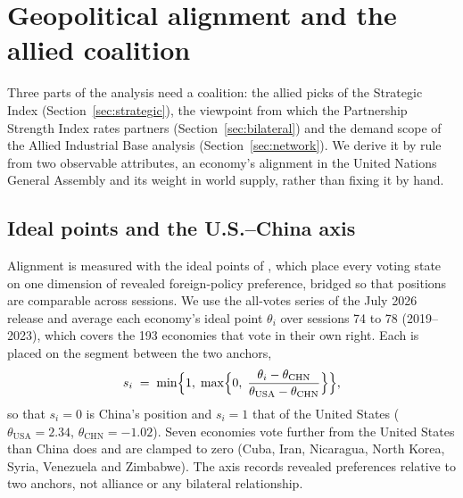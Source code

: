 \section{Geopolitical alignment and the allied coalition}\label{sec:coalition}

Three parts of the analysis need a coalition: the allied picks of the Strategic Index
(Section~\ref{sec:strategic}), the viewpoint from which the Partnership Strength Index rates partners
(Section~\ref{sec:bilateral}) and the demand scope of the Allied Industrial Base analysis
(Section~\ref{sec:network}). We
derive it by rule from two observable attributes, an economy's alignment in the United Nations
General Assembly and its weight in world supply, rather than fixing it by hand.

\subsection{Ideal points and the U.S.--China axis}\label{subsec:coalition_axis}

Alignment is measured with the ideal points of \citet{bailey2017estimating}, which place every
voting state on one dimension of revealed foreign-policy preference, bridged so that positions are
comparable across sessions. We use the all-votes series of the July 2026 release
\citep[Dataverse V39;][]{voeten2009unga} and average each economy's ideal point $\theta_i$ over
sessions 74 to 78 (2019--2023), which covers the 193 economies that vote in their own right. Each is
placed on the segment between the two anchors,
\begin{equation}\label{eq:coalition_axis}
  s_i \;=\; \min\Bigl\{1,\;\max\Bigl\{0,\;
  \frac{\theta_i-\theta_{\mathrm{CHN}}}{\theta_{\mathrm{USA}}-\theta_{\mathrm{CHN}}}\Bigr\}\Bigr\},
\end{equation}
so that $s_i=0$ is China's position and $s_i=1$ that of the United States
($\theta_{\mathrm{USA}}=2.34$, $\theta_{\mathrm{CHN}}=-1.02$). Seven economies vote further from the
United States than China does and are clamped to zero (Cuba, Iran, Nicaragua, North Korea, Syria,
Venezuela and Zimbabwe). The axis records revealed preferences relative to two anchors, not alliance
or any bilateral relationship.

